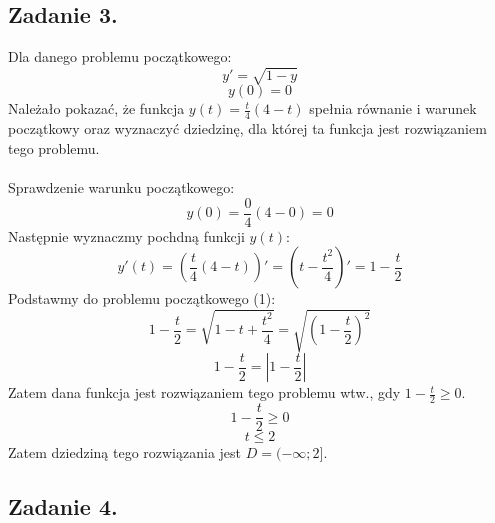\documentclass{article}
\begin{document}
\subsection{Zadanie 3.}
Dla danego problemu początkowego:
\begin{equation}
    y' = \sqrt{1-y}
\end{equation}
$$ y(0) = 0 $$
Należało pokazać, że funkcja $y(t) = \frac{t}{4}(4-t)$ spełnia równanie i warunek początkowy oraz wyznaczyć dziedzinę, dla której ta funkcja jest rozwiązaniem tego problemu.
\\\\
Sprawdzenie warunku początkowego:
$$ y(0) = \frac{0}{4}(4-0) = 0$$
Następnie wyznaczmy pochdną funkcji $y(t)$:
$$ y'(t) = (\frac{t}{4}(4-t))' = (t - \frac{t^2}{4})' = 1 - \frac{t}{2} $$
Podstawmy do problemu początkowego (1):
$$ 1-\frac{t}{2} = \sqrt{1 - t + \frac{t^2}{4}} = \sqrt{(1-\frac{t}{2})^2}$$
$$ 1-\frac{t}{2} = |1-\frac{t}{2}|$$
Zatem dana funkcja jest rozwiązaniem tego problemu wtw., gdy $1-\frac{t}{2} \geq 0$.
$$ 1-\frac{t}{2} \geq 0 $$
$$ t \leq 2$$
Zatem dziedziną tego rozwiązania jest $D = (-\infty;2]$.

\subsection{Zadanie 4.}
\end{document}
